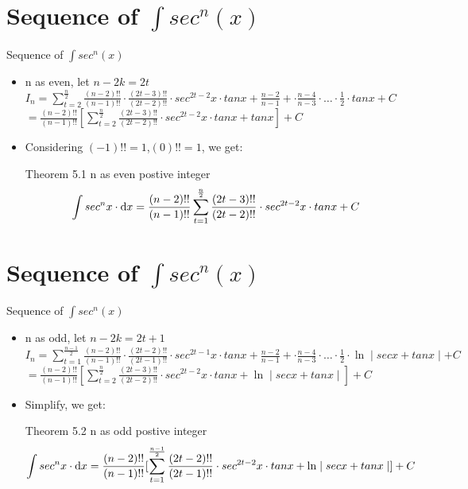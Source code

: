 \documentclass[11pt, thmnum, eqsecnum, allcites, dark]{mathbeamer}
\begin{document}
\section{Sequence of $\int sec^n(x)$}
\begin{frame}{Sequence of $\int sec^n(x)$}
\begin{itemize}[<+->]
  \begin{block}{Theorem 5.}
 $I_0 = x, I_1 = \ln \mid secx + tanx \mid , I_n = \frac{sec^{n-2}x \cdot tanx}{n-1} + \frac{n-2}{n-1} \cdot I_{n-2} (n \geq 2)$
  \end{block}
\item n as even, let $n-2k=2t$
$I_n = \sum_{t=2}^{\frac{n}{2}} \frac{(n-2)!!}{(n-1)!!} \cdot \frac{(2t-3)!!}{(2t-2)!!} \cdot sec^{2t-2}x \cdot tanx + \frac{n-2}{n-1} + \cdot \frac{n-4}{n-3} \cdot \ldots \cdot \frac{1}{2} \cdot tanx + C$
$= \frac{(n-2)!!}{(n-1)!!} [ \sum_{t=2}^{\frac{n}{2}}  \frac{(2t-3)!!}{(2t-2)!!} \cdot sec^{2t-2}x \cdot tanx + tanx] + C$

\item Considering $(-1)!!=1$,$(0)!!=1$, we get:
  \begin{block}{Theorem 5.1}
n as even postive integer
$$\int sec^nx \cdot {\rm d}x = \frac{(n-2)!!}{(n-1)!!} \sum_{t=1}^{\frac{n}{2}}  \frac{(2t-3)!!}{(2t-2)!!} \cdot sec^{2t-2}x \cdot tanx + C$$
\end{block}
\end{itemize}
\end{frame}

\section{Sequence of $\int sec^n(x)$}
\begin{frame}{Sequence of $\int sec^n(x)$}
\begin{itemize}[<+->]
  \begin{block}{Theorem 5.}
 $I_0 = x, I_1 = \ln \mid secx + tanx \mid , I_n = \frac{sec^{n-2}x \cdot tanx}{n-1} + \frac{n-2}{n-1} \cdot I_{n-2} (n \geq 2)$
  \end{block}
\item n as odd, let $n-2k=2t+1$
$I_n = \sum_{t=1}^{\frac{n-1}{2}} \frac{(n-2)!!}{(n-1)!!} \cdot \frac{(2t-2)!!}{(2t-1)!!} \cdot sec^{2t-1}x \cdot tanx + \frac{n-2}{n-1} + \cdot \frac{n-4}{n-3} \cdot \ldots \cdot \frac{1}{2} \cdot \ln \mid secx + tanx \mid + C$
$= \frac{(n-2)!!}{(n-1)!!} [ \sum_{t=2}^{\frac{n}{2}}  \frac{(2t-3)!!}{(2t-2)!!} \cdot sec^{2t-2}x \cdot tanx + \ln \mid secx + tanx \mid] + C$

\item Simplify, we get:
  \begin{block}{Theorem 5.2}
n as odd postive integer
$$\int sec^nx \cdot {\rm d}x = \frac{(n-2)!!}{(n-1)!!} [ \sum_{t=1}^{\frac{n-1}{2}}  \frac{(2t-2)!!}{(2t-1)!!} \cdot sec^{2t-2}x \cdot tanx +  \ln \mid secx + tanx \mid] + C$$
\end{block}
\end{itemize}
\end{frame}
\end{document}
